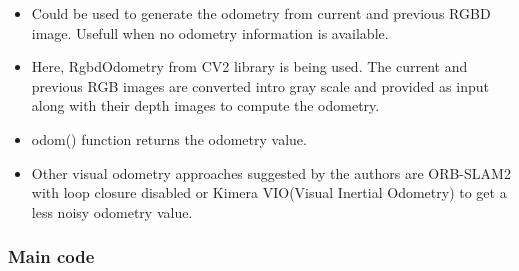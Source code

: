 \documentclass{article}
\begin{document}
\begin{itemize}
\item Could be used to generate the odometry from current and previous RGBD image. Usefull when no odometry information is available.
\item Here, RgbdOdometry from CV2 library is being used. The current and previous RGB images are converted intro gray scale and provided as input along with their depth images to compute the odometry.
\item odom() function returns the odometry value.
\item Other visual odometry approaches suggested by the authors are ORB-SLAM2 with loop closure disabled or Kimera VIO(Visual Inertial Odometry) to get a less noisy odometry value.
\end{itemize}

\subsubsection{Main code}
\end{document}
